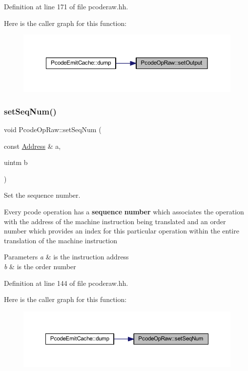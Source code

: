 Definition at line 171 of file pcoderaw.\+hh.

Here is the caller graph for this function\+:
\nopagebreak
\begin{figure}[H]
\begin{center}
\leavevmode
\includegraphics[width=350pt]{class_pcode_op_raw_a1c25e2a933548b236169924aa3b40d46_icgraph}
\end{center}
\end{figure}
\mbox{\label{class_pcode_op_raw_afabdf56ea3e97062b7daf2af34f741a1}} 
\subsubsection{\texorpdfstring{setSeqNum()}{setSeqNum()}}
{\footnotesize\ttfamily void Pcode\+Op\+Raw\+::set\+Seq\+Num (\begin{DoxyParamCaption}\item[{const \mbox{\hyperlink{class_address}{Address}} \&}]{a,  }\item[{uintm}]{b }\end{DoxyParamCaption})\hspace{0.3cm}{\ttfamily [inline]}}



Set the sequence number. 

Every pcode operation has a {\bfseries{sequence}} {\bfseries{number}} which associates the operation with the address of the machine instruction being translated and an order number which provides an index for this particular operation within the entire translation of the machine instruction 
\begin{DoxyParams}{Parameters}
{\em a} & is the instruction address \\
\hline
{\em b} & is the order number \\
\hline
\end{DoxyParams}


Definition at line 144 of file pcoderaw.\+hh.

Here is the caller graph for this function\+:
\nopagebreak
\begin{figure}[H]
\begin{center}
\leavevmode
\includegraphics[width=350pt]{class_pcode_op_raw_afabdf56ea3e97062b7daf2af34f741a1_icgraph}
\end{center}
\end{figure}


